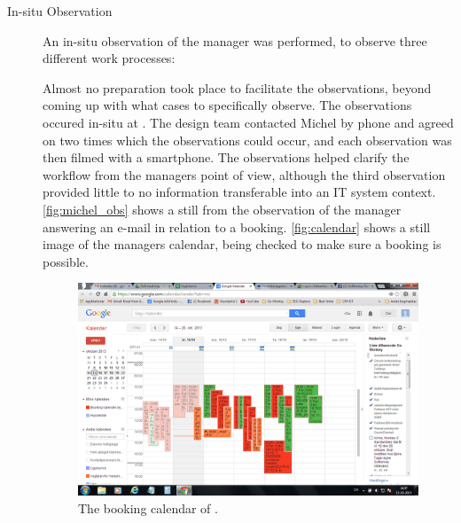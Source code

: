 \begin{description}
    \item [In-situ Observation] An in-situ observation of the manager was performed,
        to observe three different work processes: 
        Almost no preparation took place to facilitate the observations, beyond
        coming up with what cases to specifically observe. The observations
        occured in-situ at \gomonkey{}. The design team contacted Michel by
        phone and agreed on two times which the observations could occur, and
        each observation was then filmed with a smartphone. The observations
        helped clarify the workflow from the managers point of view, although
        the third observation provided little to no information transferable
        into an IT system context. \autoref{fig:michel_obs} shows a still from
        the observation of the manager answering an e-mail in relation to a
        booking. \autoref{fig:calendar} shows a still image of the managers
        calendar, being checked to make sure a booking is possible.

        \begin{figure}
            \includegraphics[width=\textwidth]{figures/calendar}
            \caption{The booking calendar of \gomonkey{ }. \label{fig:calendar}}
        \end{figure}


\end{description}

